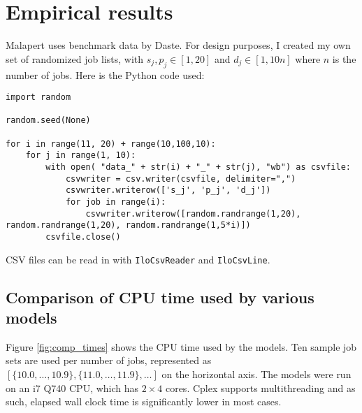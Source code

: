 \section{Empirical results}
Malapert uses benchmark data by Daste. For design purposes, I created my own set of randomized job lists, with $s_j, p_j \in [1, 20]$ and $d_j \in [1, 10n]$ where $n$ is the number of jobs. Here is the Python code used:

\lstset{language=Python}
\begin{lstlisting}
import random

random.seed(None)

for i in range(11, 20) + range(10,100,10):
    for j in range(1, 10):
        with open( "data_" + str(i) + "_" + str(j), "wb") as csvfile:
            csvwriter = csv.writer(csvfile, delimiter=",")
            csvwriter.writerow(['s_j', 'p_j', 'd_j'])
            for job in range(i):
                csvwriter.writerow([random.randrange(1,20), random.randrange(1,20), random.randrange(1,5*i)])
        csvfile.close()
\end{lstlisting}

CSV files can be read in with \texttt{IloCsvReader} and \texttt{IloCsvLine}.

\subsection{Comparison of CPU time used by various models}
Figure \ref{fig:comp_times} shows the CPU time used by the models. Ten sample
job sets are used per number of jobs, represented as $\left[\{10.0, \dots, 10.9\},
\{11.0, \dots, 11.9\},\dots \right]$ on the horizontal axis. The models were run
on an i7 Q740 CPU, which has $2 \times 4$ cores. Cplex supports multithreading
and as such, elapsed wall clock time is significantly lower in most cases.


